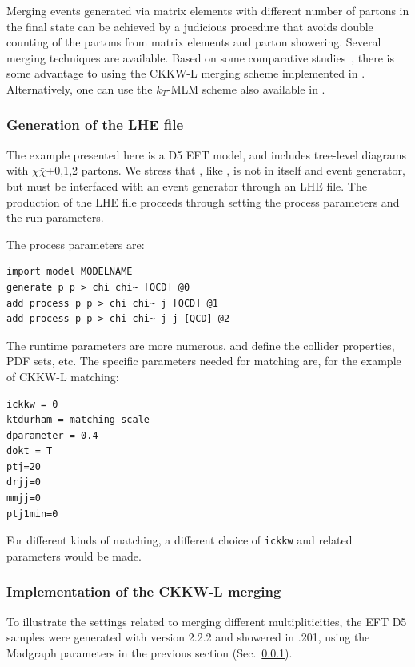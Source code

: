 Merging events generated via matrix elements with different number of partons in the final state can be achieved by a judicious procedure that  avoids double counting of the partons from matrix elements and parton showering.
Several merging techniques are available. Based on some comparative studies \,\cite{Alwall:0706.2569}, there is some advantage to using the CKKW-L merging scheme \cite{Lonnblad:2011xx} implemented in \pythiaEight.  Alternatively, one can use the $k_T$-MLM scheme also available in \pythiaEight.

\subsubsection{Generation of the LHE file}
\label{sub:MadgraphParameters}

The example presented here is a D5 EFT model, and
includes tree-level diagrams with $\chi\bar\chi$+0,1,2 partons.
We stress that \madgraph, like \powheg, is not in itself and event generator, but must be interfaced 
with an event generator through an LHE file.  The production of the LHE file proceeds through setting the 
process parameters and the run parameters.

The process parameters are:
\begin{verbatim}
import model MODELNAME
generate p p > chi chi~ [QCD] @0
add process p p > chi chi~ j [QCD] @1
add process p p > chi chi~ j j [QCD] @2
\end{verbatim}

The runtime parameters are more numerous, and define the
collider properties, PDF sets, etc.   The specific parameters
needed for matching are, for the example of CKKW-L matching:
\begin{verbatim}
ickkw = 0
ktdurham = matching scale
dparameter = 0.4
dokt = T
ptj=20
drjj=0
mmjj=0
ptj1min=0
\end{verbatim}
For different kinds of matching, a different choice of \texttt{ickkw} and
related parameters would be made.


\subsubsection{Implementation of the CKKW-L merging}
\label{sec:match_implementation}
To illustrate the settings related to merging different multipliticities, the EFT D5 samples were generated with \madgraph version 2.2.2 and showered in \pythiaEight.201, using the Madgraph parameters in the previous section (Sec.~\ref{sub:MadgraphParameters}).


